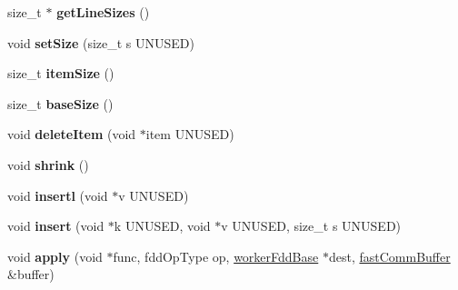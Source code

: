 \begin{DoxyCompactItemize}
\item 
\hypertarget{classfaster_1_1workerFddGroup_a65f2c1921dada1e313b6526f1eb01699}{}size\+\_\+t $\ast$ {\bfseries get\+Line\+Sizes} ()\label{classfaster_1_1workerFddGroup_a65f2c1921dada1e313b6526f1eb01699}

\item 
\hypertarget{classfaster_1_1workerFddGroup_af1c4980540ba874a02ccc4e428ffd7ff}{}void {\bfseries set\+Size} (size\+\_\+t s U\+N\+U\+S\+E\+D)\label{classfaster_1_1workerFddGroup_af1c4980540ba874a02ccc4e428ffd7ff}

\item 
\hypertarget{classfaster_1_1workerFddGroup_a41306315961dccb544e727bfea4ca84b}{}size\+\_\+t {\bfseries item\+Size} ()\label{classfaster_1_1workerFddGroup_a41306315961dccb544e727bfea4ca84b}

\item 
\hypertarget{classfaster_1_1workerFddGroup_a1299273f1bd2d218a67c9be41c2bafb8}{}size\+\_\+t {\bfseries base\+Size} ()\label{classfaster_1_1workerFddGroup_a1299273f1bd2d218a67c9be41c2bafb8}

\item 
\hypertarget{classfaster_1_1workerFddGroup_a7f786e4807bd56a4c04281756c417493}{}void {\bfseries delete\+Item} (void $\ast$item U\+N\+U\+S\+E\+D)\label{classfaster_1_1workerFddGroup_a7f786e4807bd56a4c04281756c417493}

\item 
\hypertarget{classfaster_1_1workerFddGroup_aeef69d9a639fa7ce6b5e73fd53ef5925}{}void {\bfseries shrink} ()\label{classfaster_1_1workerFddGroup_aeef69d9a639fa7ce6b5e73fd53ef5925}

\item 
\hypertarget{classfaster_1_1workerFddGroup_afb2c67bef3b890a826b653b0f1b4ef07}{}void {\bfseries insertl} (void $\ast$v U\+N\+U\+S\+E\+D)\label{classfaster_1_1workerFddGroup_afb2c67bef3b890a826b653b0f1b4ef07}

\item 
\hypertarget{classfaster_1_1workerFddGroup_ada223bb71375688bf9887b7a5b4e6492}{}void {\bfseries insert} (void $\ast$k U\+N\+U\+S\+E\+D, void $\ast$v U\+N\+U\+S\+E\+D, size\+\_\+t s U\+N\+U\+S\+E\+D)\label{classfaster_1_1workerFddGroup_ada223bb71375688bf9887b7a5b4e6492}

\item 
\hypertarget{classfaster_1_1workerFddGroup_ad0f63411c4b4049587af0d9262f830b4}{}void {\bfseries apply} (void $\ast$func, fdd\+Op\+Type op, \hyperlink{classfaster_1_1workerFddBase}{worker\+Fdd\+Base} $\ast$dest, \hyperlink{classfaster_1_1fastCommBuffer}{fast\+Comm\+Buffer} \&buffer)\label{classfaster_1_1workerFddGroup_ad0f63411c4b4049587af0d9262f830b4}


\end{DoxyCompactItemize}

